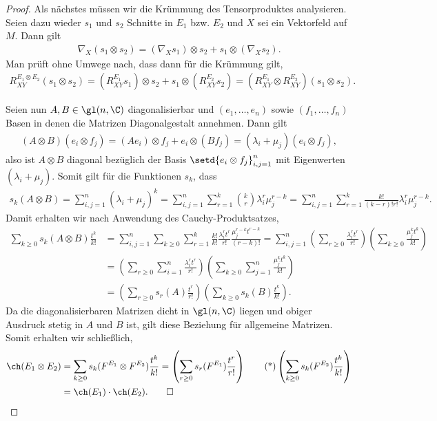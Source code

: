 \documentclass[%
	paper=a5,%
	fleqn,%
	DIV=18,%
	BCOR=0mm,
	fontsize=11pt,
	titlepage=false,%
	bibliography=totoc,
	DIV=18,%
	twoside=true,
	pdftitle=Riemannsche Geometrie,
	pdfauthor=Uwe Semmelmann,
	numbers=noendperiod]%
	{scrbook}
\begin{document}
\begin{proof}
Als nächstes müssen wir die Krümmung des Tensorproduktes analysieren.
Seien dazu wieder $s_{1}$ und $s_{2}$ Schnitte in $E_{1}$ bzw. $E_{2}$ und $X$ sei ein Vektorfeld auf $M$. Dann gilt
\begin{align*}
\nabla_{X}(s_{1}\otimes s_{2}) = (\nabla_{X}s_{1})\otimes s_{2} + s_{1}\otimes(\nabla_{X} s_{2}).
\end{align*}
Man prüft ohne Umwege nach, dass dann für die Krümmung gilt,
\begin{align*}
R_{XY}^{E_{1}\otimes E_{2}}(s_{1}\otimes s_{2}) = (R_{XY}^{E_{1}}s_{1})\otimes s_{2} + s_{1}\otimes(R_{XY}^{E_{2}}s_{2}) = 
(R_{{XY}}^{E_{1}}\otimes R_{XY}^{E_{2}})(s_{1}\otimes s_{2}).
\end{align*}

Seien nun $A,B\in \gl(n,\C)$ diagonalisierbar und $(e_{1},\ldots,e_{n})$ sowie $(f_{1},\ldots,f_{n})$ Basen in denen die Matrizen Diagonalgestalt annehmen. Dann gilt
\begin{align*}
(A\otimes B)(e_{i}\otimes f_{j}) = (A e_{i})\otimes f_{j} + e_{i}\otimes (B f_{j})
= (\lambda_{i} + \mu_{j}) (e_{i}\otimes f_{j}),
\end{align*}
also ist $A\otimes B$ diagonal bezüglich der Basis $\setd{e_{i}\otimes f_{j}}_{i,j=1}^n$ mit Eigenwerten $(\lambda_{i}+\mu_{j})$.   Somit gilt für die Funktionen $s_{k}$, dass
\begin{align*}
s_{k}(A\otimes B) = \sum_{i,j=1}^n (\lambda_{i}+\mu_{j})^k
=
\sum_{i,j=1}^n\sum_{r=1}^k \binom{k}{r} \lambda_{i}^r\mu_{j}^{r-k}
=
\sum_{i,j=1}^n\sum_{r=1}^k \frac{k!}{(k-r)!r!} \lambda_{i}^r\mu_{j}^{r-k}.
\end{align*}
Damit erhalten wir nach Anwendung des Cauchy-Produktsatzes,
\begin{align*}
\sum_{k\ge 0} s_{k}(A\otimes B) \frac{t^k}{k!} &= 
\sum_{i,j=1}^n \sum_{k\ge 0} \sum_{r=1}^k
\frac{k!}{k!}  \frac{\lambda_{i}^rt^r}{r!}\frac{\mu_{j}^{r-k}t^{r-k}}{(r-k)!} = 
\sum_{i,j=1}^n \left(\sum_{r\ge 0} \frac{\lambda_{i}^rt^r}{r!}\right)
 \left(\sum_{k\ge 0} \frac{\mu_{j}^kt^k}{k!}\right)\\
&=
\left(\sum_{r\ge 0} \sum_{i=1}^n\frac{\lambda_{i}^rt^r}{r!}\right)
 \left(\sum_{k\ge 0} \sum_{j=1}^n\frac{\mu_{j}^kt^k}{k!}\right)\\
&= 
\left(\sum_{r\ge 0} s_{r}(A) \frac{t^r}{r!}\right)
 \left(\sum_{k\ge 0} s_{k}(B)\frac{t^k}{k!}\right).
\end{align*}
Da die diagonalisierbaren Matrizen dicht in $\gl(n,\C)$ liegen und obiger Ausdruck stetig in $A$ und $B$ ist, gilt diese Beziehung für allgemeine Matrizen. Somit erhalten wir schließlich,
\begin{align*}
\ch(E_{1}\otimes E_{2}) &= \sum_{k\ge0} s_{k}(F^{E_{1}}\otimes F^{E_{2}}) \frac{t^k}{k!}
=
\left(\sum_{r\ge 0} s_{r}(F^{E_{1}}) \frac{t^r}{r!}\right)\tag{*}
 \left(\sum_{k\ge 0} s_{k}(F^{E_{2}})\frac{t^k}{k!}\right)\\
& = \ch(E_{1})\cdot \ch(E_{2}).\qed
\end{align*}
\end{proof}
\end{document}
